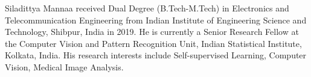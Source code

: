 \documentclass[journal]{IEEEtai}
\begin{document}
{\small


}































































































\begin{IEEEbiography}[{\texttt{[image: sm1]}}]{Siladittya Manna}{\space}a received Dual Degree (B.Tech-M.Tech) in Electronics
and Telecommunication Engineering from Indian Institute of Engineering
Science and Technology, Shibpur, India in 2019. He is currently a Senior
Research Fellow at the Computer Vision and Pattern Recognition Unit,
Indian Statistical Institute, Kolkata, India. His research interests include
Self-supervised Learning, Computer Vision, Medical Image Analysis.

\end{IEEEbiography}
\end{document}
